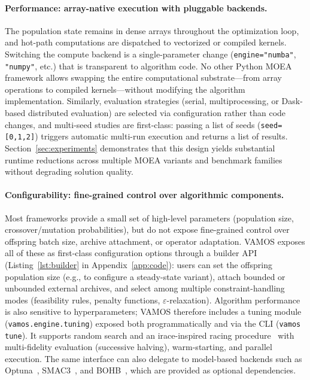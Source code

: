 \documentclass[journal]{IEEEtran}
\newcommand{\VAMOS}{VAMOS}
\begin{document}
\paragraph{Performance: array-native execution with pluggable backends.}
The population state remains in dense arrays throughout the optimization loop, and hot-path computations are dispatched to vectorized or compiled kernels. Switching the compute backend is a single-parameter change (\texttt{engine="numba"}, \texttt{"numpy"}, etc.) that is transparent to algorithm code. No other Python MOEA framework allows swapping the entire computational substrate---from array operations to compiled kernels---without modifying the algorithm implementation. Similarly, evaluation strategies (serial, multiprocessing, or Dask-based distributed evaluation) are selected via configuration rather than code changes, and multi-seed studies are first-class: passing a list of seeds (\texttt{seed=[0,1,2]}) triggers automatic multi-run execution and returns a list of results. Section~\ref{sec:experiments} demonstrates that this design yields substantial runtime reductions across multiple MOEA variants and benchmark families without degrading solution quality.

\paragraph{Configurability: fine-grained control over algorithmic components.}
Most frameworks provide a small set of high-level parameters (population size, crossover/mutation probabilities), but do not expose fine-grained control over offspring batch size, archive attachment, or operator adaptation. \VAMOS{} exposes all of these as first-class configuration options through a builder API (Listing~\ref{lst:builder} in Appendix~\ref{app:code}): users can set the offspring population size (e.g., to configure a steady-state variant), attach bounded or unbounded external archives, and select among multiple constraint-handling modes (feasibility rules, penalty functions, $\varepsilon$-relaxation). Algorithm performance is also sensitive to hyperparameters; \VAMOS{} therefore includes a tuning module (\texttt{vamos.engine.tuning}) exposed both programmatically and via the CLI (\texttt{vamos tune}). It supports random search and an irace-inspired racing procedure~\cite{LDP+16} with multi-fidelity evaluation (successive halving), warm-starting, and parallel execution. The same interface can also delegate to model-based backends such as Optuna~\cite{ASY+19}, SMAC3~\cite{LEF+22}, and BOHB~\cite{FKH18}, which are provided as optional dependencies.
\end{document}
